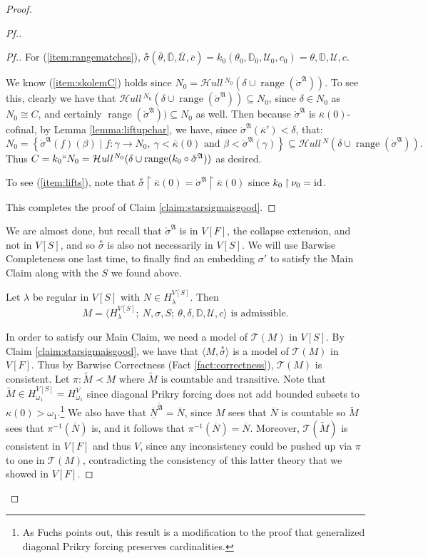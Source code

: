 \documentclass{amsart}
\theoremstyle{definition}
\theoremstyle{remark}
\newcommand{\D}{\mathbb{D}}
\newcommand{\N}{{\overline{N}}}
\newcommand{\U}{\mathcal{U}}
\newcommand{\id}{\textup{\ensuremath{\text{id}}}}
\DeclareMathOperator{\ran}{range}
\newcommand{\st}{\; | \;}
\newcommand{\set}[2]{\left\{#1\st #2 \right\}}
\newcommand{\rest}{\mathbin{\upharpoonright}}
\newcommand{\SH}{\mathcal{H}\textit{ull} \,}
\newcommand{\sk}[3]{\SH^{#1}( {#2} \cup {\ran(#3)} ) }
\begin{document}
\begin{proof}
\begin{proof}[Pf.]
\begin{proof}[Pf.]
For (\ref{item:rangematches}), $\overset{*} {\sigma}(\overline \theta, \overline{\D}, \overline{\U}, \overline c)= k_0(\theta_0, \D_0, \U_0, c_0) =\theta, \D, \U, c$.

We know (\ref{item:skolemC}) holds since $N_0 = \sk{N_0}{\delta}{\mathring \sigma^{\mathfrak A}}$. To see this, clearly we have that $\sk{N_0}{\delta}{\mathring \sigma^{\mathfrak A}} \subseteq N_0$, since $\delta \in N_0$ as $N_0 \cong C$, and certainly $\ran(\mathring \sigma^{\mathfrak A})) \subseteq N_0$ as well. 
Then because $\mathring \sigma^{\mathfrak A}$ is $\overline \kappa(0)$-cofinal, by Lemma \ref{lemma:liftupchar}, we have, since $\mathring \sigma^{\mathfrak A}(\overline \kappa') < \delta$, that:
$$N_0 = \set{\mathring \sigma^{\mathfrak A}(f)(\beta)}{ f: \gamma \longrightarrow N_0, \ \gamma < \overline \kappa(0) \text{ and } \beta < \mathring \sigma^{\mathfrak A}(\gamma) } \subseteq \sk{N}{\delta}{\mathring \sigma^{\mathfrak A}}.$$
Thus $C = k_0``N_0=\sk{N_0}{\delta}{k_0 \circ \mathring \sigma^{\mathfrak A}}$ as desired. 

To see (\ref{item:lifts}), note that $\overset{*} {\sigma} \rest \overline \kappa(0) = \mathring{\sigma}^{\mathfrak A} \rest \overline \kappa(0)$ since $k_0 \rest \nu_0 = \id$.

This completes the proof of Claim \ref{claim:starsigmaisgood}.
\end{proof}

We are almost done, but recall that $\mathring{\sigma}^{\mathfrak A}$ is in $V[F]$, the collapse extension, and not in $V[S]$, and so $\overset{*} {\sigma}$ is also not necessarily in $V[S]$. We will use Barwise Completeness one last time, to finally find an embedding $\sigma'$ to satisfy the Main Claim along with the $S$ we found above.

Let $\lambda$ be regular in $V[S]$ with $N \in H_\lambda^{V[S]}$. Then 
	$$M = \langle H^{V[S]}_\lambda;\ N, \sigma, S;\ \theta, \delta, \D, \U, c \rangle \text{ is admissible.}$$

In order to satisfy our Main Claim, we need a model of $\mathcal T(M)$ in $V[S]$. By Claim \ref{claim:starsigmaisgood}, we have that $\langle M , \overset{*} {\sigma}\rangle$ is a model of $\mathcal T(M)$ in $V[F]$. Thus by Barwise Correctness (Fact \ref{fact:correctness}), $\mathcal T(M)$ is consistent.
Let 
	$\pi: \tilde M \prec M \text{ where $\tilde M$ is countable and transitive.}$
Note that $\tilde M \in H_{\omega_1}^{V[S]}=H_{\omega_1}^V$ since diagonal Prikry forcing does not add bounded subsets to  $\kappa(0) > \omega_1$.\footnote{As Fuchs \cite[p.~966]{Fuchs:2005kx} points out, this result is a modification to the proof that generalized diagonal Prikry forcing preserves cardinalities.} 
We also have that $\overline{\underline N}^{\tilde{\mathfrak A}} = \N$, since $M$ sees that $\N$ is countable so $\tilde{M}$ sees that $\pi^{-1}(\N)$ is, and it follows that $\pi^{-1}(\N)=\N$.
Moreover, $\mathcal T(\tilde M)$ is consistent in $V[F]$ and thus $V$, since any inconsistency could be pushed up via $\pi$ to one in $\mathcal T(M)$, contradicting the consistency of this latter theory that we showed in $V[F]$.


\end{proof}
\end{proof}
\end{document}
